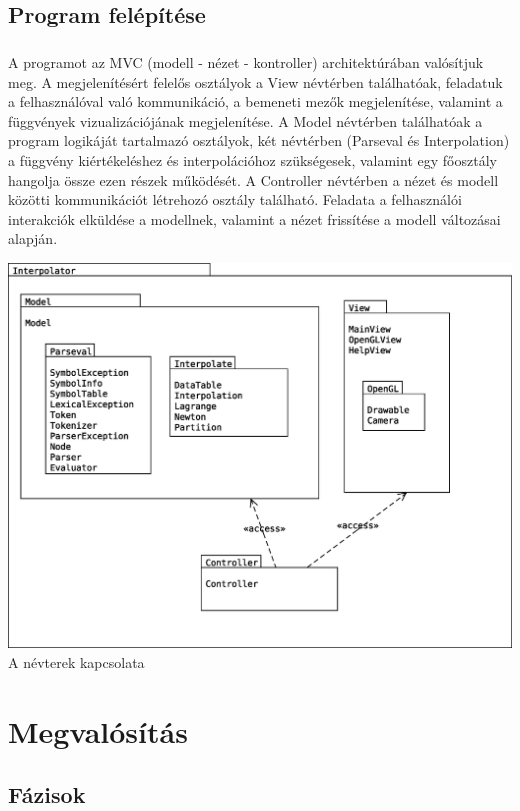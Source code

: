 \documentclass[12pt]{report}
\begin{document}
\subsection{Program felépítése}
\paragraph{}
A programot az MVC\textsuperscript{\cite{mvc}} (modell - nézet - kontroller) architektúrában valósítjuk meg. A megjelenítésért felelős osztályok a View névtérben találhatóak, feladatuk a felhasználóval való kommunikáció, a bemeneti mezők megjelenítése, valamint a függvények vizualizációjának megjelenítése. A Model névtérben találhatóak a program logikáját tartalmazó osztályok, két névtérben (Parseval és Interpolation) a függvény kiértékeléshez és interpolációhoz szükségesek, valamint egy főosztály hangolja össze ezen részek működését. A Controller névtérben a nézet és modell közötti kommunikációt létrehozó osztály található. Feladata a felhasználói interakciók elküldése a modellnek, valamint a nézet frissítése a modell változásai alapján.
\begin{center}
\includegraphics[width=14cm]{pics/uml/package}\\
{\footnotesize A névterek kapcsolata}
\end{center}
\newpage

\section{Megvalósítás}
\subsection{Fázisok}
\end{document}
